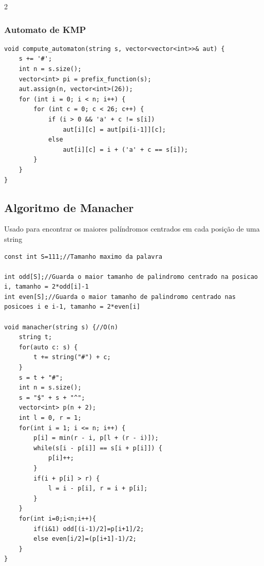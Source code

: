 \documentclass[11pt]{article}
\begin{document}
\begin{multicols}{2}
\subsubsection{Automato de KMP}
\begin{lstlisting}
void compute_automaton(string s, vector<vector<int>>& aut) {
    s += '#';
    int n = s.size();
    vector<int> pi = prefix_function(s);
    aut.assign(n, vector<int>(26));
    for (int i = 0; i < n; i++) {
        for (int c = 0; c < 26; c++) {
            if (i > 0 && 'a' + c != s[i])
                aut[i][c] = aut[pi[i-1]][c];
            else
                aut[i][c] = i + ('a' + c == s[i]);
        }
    }
}
\end{lstlisting}

\subsection{Algoritmo de Manacher}
Usado para encontrar os maiores palíndromos centrados em cada posição de uma string
\begin{lstlisting}
const int S=111;//Tamanho maximo da palavra

int odd[S];//Guarda o maior tamanho de palindromo centrado na posicao i, tamanho = 2*odd[i]-1
int even[S];//Guarda o maior tamanho de palindromo centrado nas posicoes i e i-1, tamanho = 2*even[i]

void manacher(string s) {//O(n)
    string t;
    for(auto c: s) {
        t += string("#") + c;
    }
    s = t + "#";
    int n = s.size();
    s = "$" + s + "^";
    vector<int> p(n + 2);
    int l = 0, r = 1;
    for(int i = 1; i <= n; i++) {
        p[i] = min(r - i, p[l + (r - i)]);
        while(s[i - p[i]] == s[i + p[i]]) {
            p[i]++;
        }
        if(i + p[i] > r) {
            l = i - p[i], r = i + p[i];
        }
    }
    for(int i=0;i<n;i++){
        if(i&1) odd[(i-1)/2]=p[i+1]/2;
        else even[i/2]=(p[i+1]-1)/2;
    }
}
\end{lstlisting}


\end{multicols}
\end{document}
